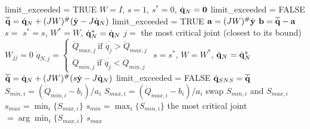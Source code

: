 \documentclass[10pt, a4paper]{report}
\begin{document}
\begin{algorithm}[H]
    \caption{Saturation in the Null Space}\label{alg:SNS}
    \begin{algorithmic}[1]
    \State limit\_exceeded = TRUE
    \State $W=I$, $s=1$, $s^*=0$, ${\dot{\mathbf q}}_N=\mathbf 0$ 
    \State limit\_exceeded = FALSE
    \State $\overline{{\dot{\mathbf q}}}={\dot{\mathbf q}}_N+(JW)^\#({\dot{\mathbf y}}-J{\dot{\mathbf q}}_N)$\label{alg:first_assignment}
    \label{alg:check_bounds}
    \State {}
    \State limit\_exceeded = TRUE
    \State $\mathbf a=(JW)^\#{\dot{\mathbf y}}$
    \State $\mathbf b=\overline{{\dot{\mathbf q}}}-\mathbf a$
    \State  $s=$ \label{alg:scl_factor}
    \label{alg:largesr_factor_obtained}
    \State $s^*=s$, $W^*=W$, ${\dot{\mathbf q}}_N^*={\dot{\mathbf q}}_N$
    \EndIf 
    \State $j=$ the most critical joint (closest to its bound) \label{alg:disable_crit1}
    \State $W_{jj}=0$\label{alg:disable_crit2}
    \State $\dot q_{N,j}=\begin{cases}
        \dot Q_{max,j} \ \text{if }\overline{\dot q_j} > \dot Q_{max,j}\\ 
        \dot Q_{min,j}  \ \text{if }\overline{\dot q_j} < \dot Q_{min,j}
    \end{cases}$\label{alg:disable_crit3}
    \label{alg:rankJW}
    \State $s=s^*$, $W=W^*$, ${\dot{\mathbf q}}_N={\dot{\mathbf q}}_N^*$
    \State $\overline{{\dot{\mathbf q}}}={\dot{\mathbf q}}_N+(JW)^\#(s{\dot{\mathbf y}}-J{\dot{\mathbf q}}_N)$ \label{alg:exit1}
    \State limit\_exceeded = FALSE  \label{alg:exit2}
    \EndIf
    \EndIf
    \EndWhile
    \State \Return ${\dot{\mathbf q}}_{SNS}=\overline{{\dot{\mathbf q}}}$
    \EndFunction
    \vspace{0.5cm}
    \label{alg:SF_alg}
    \State {}
        \State $S_{min,i} = (\dot{Q}_{min,i} - b_i) / a_i$\label{alg:Smin}
        \State $S_{max,i} = (\dot{Q}_{max,i} - b_i) / a_i$\label{alg:Smax}
            \State swap $S_{min,i}$ and $S_{max,i}$\label{alg:switch}
        \EndIf
    \EndFor
    \State $s_{max} = \min_i \{S_{max,i}\}$
    \State $s_{min} = \max_i \{S_{min,i}\}$
    \State the most critical joint $= \arg \min_i \{S_{max,i}\}$
        \State{}\label{alg:ret0}
    \Else
        \State\Return $s_{max}$\label{alg:retsmax}
    \EndIf
    \EndFunction
    \end{algorithmic}
\end{algorithm}
\end{document}
